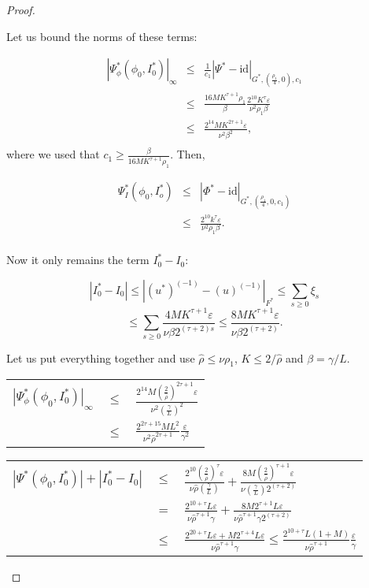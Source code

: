 \begin{proof}
\begin{enumerate}
Let us bound the norms of these terms:

$$
\begin{array}{rcl}
 |\Psi_\phi^* (\phi_0,I_0^* )|_\infty & \leq & \frac{1}{c_1}|\Psi^* -\text{id}|_{G^*,(\frac{\rho_1}{4},0),c_1}\\
 & \leq & \frac{16 M K^{\tau+1} \rho_1}{\beta}\frac{2^{10} K^\tau \varepsilon}{\nu^2 \rho_1 \beta}\\
 & \leq & \frac{2^{14} M K^{2\tau+1} \varepsilon}{\nu^2 \beta^2},\\
\end{array}
$$
where we used that $c_1 \geq \frac{\beta}{16 M K^{\tau+1}\rho_1}$. Then,

$$
\begin{array}{rcl}
 \Psi_I^*(\phi_0,I_o^*) & \leq & |\Phi^* - \text{id}|_{G^*,(\frac{\rho_1}{4},0,c_1)}\\
 & \leq & \frac{2^{10} k^\tau \varepsilon}{\nu^2 \rho_1 \beta}. \\
\end{array}
$$

Now it only remains the term $I_0^* -I_0$:

$$|I_0^* - I_0| \leq |(u^*)^{(-1)} - (u)^{(-1)}|_{F^*} \leq \sum_{s\geq 0} \xi_s $$
$$\leq \sum_{s\geq 0} \frac{4 M K^{\tau+1}\varepsilon}{\nu \beta 2^{(\tau+2)s}} \leq \frac{8M K^{\tau+1}\varepsilon}{\nu \beta 2^{(\tau+2)}}.$$

Let us put everything together and use $\hat \rho \leq \nu \rho_1$, $K \leq 2/\hat \rho$ and $\beta = \gamma/L$.


\begin{longtable}{rcl}
 $|\Psi_\phi^* (\phi_0, I_0^* )|_\infty$ & $\leq$ & $\frac{2^{14} M (\frac{2}{\hat \rho})^{2\tau+1}\varepsilon}{\nu^2 (\frac{\gamma}{L})^2}$\\
 &$\leq$& $\frac{2^{2\tau + 15} M L^2}{\nu^2 \hat \rho^{2\tau+1}}\frac{\varepsilon}{\gamma^2}$\\
\end{longtable}

\begin{longtable}{rcl}
 $|\Psi^*(\phi_0,I_0^*)| + |I_0^* - I_0| $ & $\leq$ & $\frac{2^{10}(\frac{2}{\hat \rho})^\tau\varepsilon}{\nu \hat \rho (\frac{\gamma}{L})} + \frac{8M (\frac{2}{\hat \rho})^{\tau+1} \varepsilon}{\nu (\frac{\gamma}{L}) 2^{(\tau+2)}}$\\
 & $=$ & $\frac{2^{10+\tau} L\varepsilon}{\nu \hat \rho^{\tau+1} \gamma} + \frac{8 M 2^{\tau+1} L \varepsilon}{\nu \hat \rho^{\tau+1}\gamma 2^{(\tau+2)}}$\\
 & $\leq$& $\frac{2^{20+\tau} L\varepsilon + M 2^{\tau+4}L\varepsilon}{\nu \hat \rho^{\tau+1}\gamma} \leq \frac{2^{10+\tau} L (1+M)}{\nu \hat \rho^{\tau+1}}\frac{\varepsilon}{\gamma}$\\
\end{longtable}


\end{enumerate}
\end{proof}
